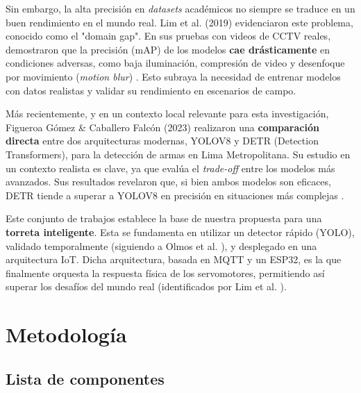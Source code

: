 \documentclass{article}
\begin{document}
Sin embargo, la alta precisión en \textit{datasets} académicos no siempre se traduce en un buen rendimiento en el mundo real. Lim et al. (2019) evidenciaron este problema, conocido como el "domain gap". En sus pruebas con videos de CCTV reales, demostraron que la precisión (mAP) de los modelos \textbf{cae drásticamente} en condiciones adversas, como baja iluminación, compresión de video y desenfoque por movimiento (\textit{motion blur}) \cite{lim_2019}. Esto subraya la necesidad de entrenar modelos con datos realistas y validar su rendimiento en escenarios de campo.

Más recientemente, y en un contexto local relevante para esta investigación, Figueroa Gómez \& Caballero Falcón (2023) realizaron una \textbf{comparación directa} entre dos arquitecturas modernas, YOLOV8 y DETR (Detection Transformers), para la detección de armas en Lima Metropolitana. Su estudio en un contexto realista es clave, ya que evalúa el \textit{trade-off} entre los modelos más avanzados. Sus resultados revelaron que, si bien ambos modelos son eficaces, DETR tiende a superar a YOLOV8 en precisión en situaciones más complejas \cite{figueroa_2023}. 

Este conjunto de trabajos establece la base de nuestra propuesta para una \textbf{torreta inteligente}. Esta se fundamenta en utilizar un detector rápido (YOLO), validado temporalmente (siguiendo a Olmos et al. \cite{olmos_2018}), y desplegado en una arquitectura IoT. Dicha arquitectura, basada en MQTT y un ESP32, es la que finalmente orquesta la respuesta física de los servomotores, permitiendo así superar los desafíos del mundo real (identificados por Lim et al. \cite{lim_2019}).

\section{Metodología}

\subsection{Lista de componentes}
\end{document}
